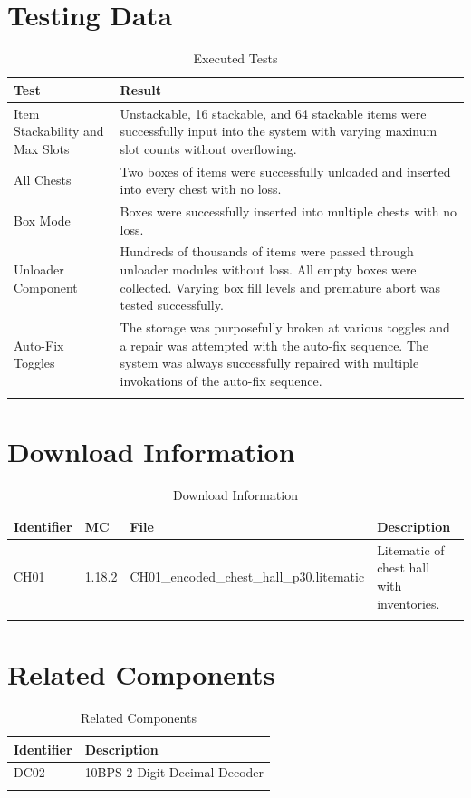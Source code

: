 \documentclass[10pt]{datasheet}
\begin{document}
\section{Testing Data}

\begin{table}[h]
\caption{Executed Tests}
\begin{tabularx}{\textwidth}{l | X}
    \thickhline
    \textbf{Test} & \textbf{Result} \\
    \hline
    Item Stackability and Max Slots & Unstackable, 16 stackable, and 64 stackable items were successfully input into the system with varying maxinum slot counts without overflowing.\\
    \hline
    All Chests & Two boxes of items were successfully unloaded and inserted into every chest with no loss.\\
    \hline
    Box Mode & Boxes were successfully inserted into multiple chests with no loss.\\
    \hline
    Unloader Component & Hundreds of thousands of items were passed through unloader modules without loss. All empty boxes were collected. Varying box fill levels and premature abort was tested successfully.\\
    \hline
    Auto-Fix Toggles & The storage was purposefully broken at various toggles and a repair was attempted with the auto-fix sequence. The system was always successfully repaired with multiple invokations of the auto-fix sequence.\\
    \thickhline
\end{tabularx}
\end{table}

\section{Download Information}
\begin{table}[h]
    \caption{Download Information}
    \begin{tabularx}{\textwidth}{l | l | l | X}
        \thickhline
        \textbf{Identifier} & \textbf{MC} & \textbf{File} & \textbf{Description} \\
        \hline
        CH01 & 1.18.2 & CH01\_encoded\_chest\_hall\_p30.litematic & Litematic of chest hall with inventories. \\
        \thickhline
    \end{tabularx}
\end{table}

\newpage
\section{Related Components}
\begin{table}[h]
    \caption{Related Components}
    \begin{tabularx}{\textwidth}{ l | l }
        \thickhline
        \textbf{Identifier} & \textbf{Description} \\
        \hline
        DC02 & 10BPS 2 Digit Decimal Decoder \\
        \thickhline
    \end{tabularx}
\end{table}
\end{document}
